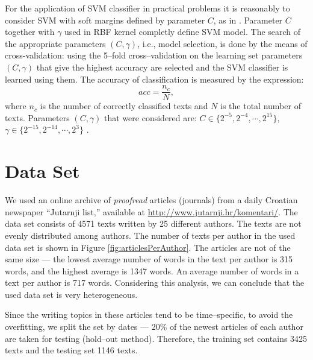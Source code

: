 \documentclass{llncs}
\begin{document}
For the application of SVM classifier in practical problems it is reasonably to
consider SVM with soft margins defined by parameter $C$, as in 
\cite{cortes1995support}. Parameter $C$ together with $\gamma$ used in RBF
kernel completly define SVM model. The search of the appropriate parameters
$(C, \gamma)$, i.e., model selection, is done by the means of cross-validation:
using the 5--fold cross--validation on the learning set parameters $(C, \gamma)$ that give the highest accuracy are selected and the SVM classifier is learned using them. The accuracy of classification is measured by the expression:
\begin{equation}
acc = \frac{n_c}{N}, %
\end{equation}
where $n_c$ is the number of correctly classified texts and $N$ is the total number of
texts.
Parameters $(C, \gamma)$ that were considered are: $C \in \{2^{-5}, 2^{-4},
\cdots , 2^{15}\}$, $\gamma \in \{2^{-15}, 2^{-14}, \cdots, 2^3\}$ \cite{CC01a}.

\section{Data Set}
\label{sec:podatci}
We used an online archive of \emph{proofread} articles (journals) from a daily
Croatian newspaper ``Jutarnji list,'' available at
\url{http://www.jutarnji.hr/komentari/}. The data set consists of 4571 texts
written by 25 different authors. The texts are not evenly distributed
among authors. The number of texts per author in the used data set is shown in
Figure \ref{fig:articlesPerAuthor}. The articles are not of the same size --- the 
lowest average number of words in the text per author is 315 words, and
the highest average is 1347 words. An average number of words in a text per author is 717 words.
Considering this analysis, we can conclude that the used data set is very
heterogeneous.

Since the writing topics in these articles tend to be time--specific, to avoid the
overfitting, we split the set by dates --- 20\% of the newest articles of each author are
taken for testing (hold--out method). Therefore, the training set contains 3425 texts
and the testing set 1146 texts.

\begin{minipage}{0.8\linewidth}
\vspace{10pt}
\centerline{\resizebox{0.7\linewidth}{!}{}}%
%
\label{fig:articlesPerAuthor}
\end{minipage}
\end{document}
